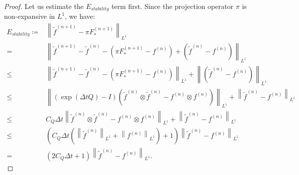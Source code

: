 \documentclass{article}
\numberwithin{equation}{section}
\begin{document}
\begin{proof}
    Let us estimate the $E_{stability}$ term first. Since the projection operator $\pi$ is non-expansive in $L^{1}$, we have:
    \begin{equation*}
        \begin{split}
            E_{stability} \coloneqq &\left\lVert \widetilde{f}^{(n+1)}- \pi F_{*}^{(n+1)}\right\rVert_{L^{1}}\\
            =& \left\lVert \widetilde{f}^{(n+1)} - \widetilde{f}^{(n)}- \left(\pi F_{*}^{(n+1)}-f^{(n)}\right) + \left(\widetilde{f}^{(n)} - f^{(n)}\right)\right\rVert_{L^{1}}\\
            \leq& \left\lVert \widetilde{f}^{(n+1)} - \widetilde{f}^{(n)}- \left(\pi F_{*}^{(n+1)}-f^{(n)}\right)\right\rVert_{L^{1}} + \left\lVert \left(\widetilde{f}^{(n)} - f^{(n)}\right)\right\rVert_{L^{1}}\\
            \leq& \left\lVert \left(\exp{(\Delta t Q)} - I \right)\left(\widetilde{f}^{(n)}\otimes \widetilde{f}^{(n)} - f^{(n)}\otimes f^{(n)}\right) \right\rVert_{L^{1}} + \left\lVert \widetilde{f}^{(n)} - f^{(n)}\right\rVert_{L^{1}}\\
            \leq& C_{Q}\Delta t \left\lVert\widetilde{f}^{(n)}\otimes \widetilde{f}^{(n)} - f^{(n)}\otimes f^{(n)} \right\rVert_{L^{1}} + \left\lVert \widetilde{f}^{(n)} - f^{(n)}\right\rVert_{L^{1}}\\
            \leq& \left(C_{Q}\Delta t \left(\left\lVert \widetilde{f}^{(n)}\right\rVert_{L^{1}}+ \left\lVert  f^{(n)}\right\rVert_{L^{1}}\right) + 1\right)\left\lVert \widetilde{f}^{(n)} - f^{(n)}\right\rVert_{L^{1}}\\
            =&\left(2 C_{Q}\Delta t  + 1\right)\left\lVert \widetilde{f}^{(n)} - f^{(n)}\right\rVert_{L^{1}}.
        \end{split}
    \end{equation*}


\end{proof}
\end{document}
